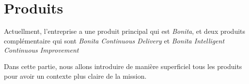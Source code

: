 \section{Produits} \label{produits}
Actuellment, l'entreprise a une produit principal qui est \emph{Bonita}, et deux produits complémentaire qui sont \textit{Bonita Continuous Delivery} et \textit{Bonita Intelligent Continuous Improvement}

Dans cette partie, nous allons introduire de manière superficiel tous les produits pour avoir un contexte plus claire de la mission.




